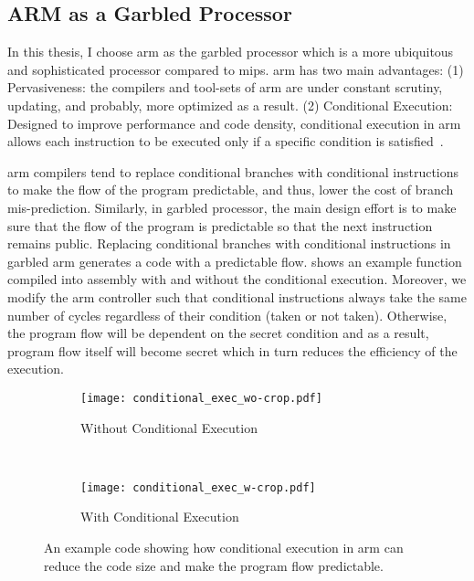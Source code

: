\subsection{ARM as a Garbled Processor}\label{ssec:arm}
In this thesis, I choose \gls{arm} as the garbled processor which is a more ubiquitous and sophisticated processor compared to \gls{mips}.
\gls{arm} has two main advantages:
(1) Pervasiveness: the compilers and tool-sets of \gls{arm} are under constant scrutiny, updating, and probably, more optimized as a result.
(2) Conditional Execution: Designed to improve performance and code density, conditional execution in \gls{arm} allows each instruction to be executed only if a specific condition is satisfied~\cite{sloss2004arm}.

\gls{arm} compilers tend to replace conditional branches with conditional instructions to make the flow of the program predictable, and thus, lower the cost of branch mis-prediction.
Similarly, in garbled processor, the main design effort is to make sure that the flow of the program is predictable so that the next instruction remains public.
Replacing conditional branches with conditional instructions in garbled \gls{arm} generates a code with a predictable flow.
 shows an example function compiled into assembly with and without the conditional execution.
Moreover, we modify the \gls{arm} controller such that conditional instructions always take the same number of cycles regardless of their condition (taken or not taken).
Otherwise, the program flow will be dependent on the secret condition and as a result, program flow itself will become secret which in turn reduces the efficiency of the execution.

\begin{figure}
    \centering
    \begin{subfigure}{0.40\columnwidth}
        \centering
        \texttt{[image: conditional\_exec\_wo-crop.pdf]}
        \caption{Without Conditional Execution}
    \end{subfigure}
    ~
    \begin{subfigure}{0.40\columnwidth}
        \centering
        \texttt{[image: conditional\_exec\_w-crop.pdf]}
        \caption{With Conditional Execution}
    \end{subfigure}
    \caption{An example code showing how conditional execution in \gls{arm} can reduce the code size and make the program flow predictable.}\label{fig:conditional_exec}
\end{figure}

